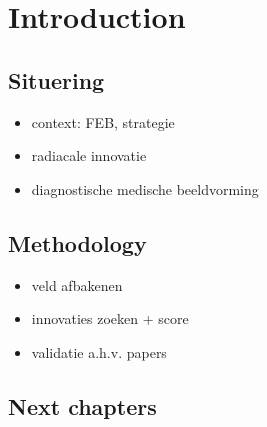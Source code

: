 \chapter{Introduction} %

\section{Situering}
\begin{itemize}
  \item context: FEB, strategie
  \item radiacale innovatie
  \item diagnostische medische beeldvorming
\end{itemize}


\section{Methodology}
\begin{itemize}
  \item veld afbakenen
  \item innovaties zoeken + score
  \item validatie a.h.v. papers
\end{itemize}

\section{Next chapters}

